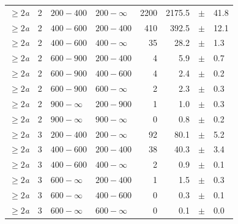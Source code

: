 \begin{table}[!h]
\begin{tabular}{rrllrrcl}
$\geq 2${\it a}\T & 2 & $ 200- 400$ & $200-\infty$ &   2200 &   2175.5 &$\pm$&   41.8 \\
$\geq 2${\it a}\T & 2 & $ 400- 600$ & $200-400$ &    410 &    392.5 &$\pm$&   12.1 \\
$\geq 2${\it a} & 2 & $ 400- 600$ & $400-\infty$ &     35 &     28.2 &$\pm$&    1.3 \\
$\geq 2${\it a}\T & 2 & $ 600- 900$ & $200-400$ &      4 &      5.9 &$\pm$&    0.7 \\
$\geq 2${\it a} & 2 & $ 600- 900$ & $400-600$ &      4 &      2.4 &$\pm$&    0.2 \\
$\geq 2${\it a} & 2 & $ 600- 900$ & $600-\infty$ &      2 &      2.3 &$\pm$&    0.3 \\
$\geq 2${\it a}\T & 2 & $ 900- \infty$ & $200-900$ &      1 &      1.0 &$\pm$&    0.3 \\
$\geq 2${\it a} & 2 & $ 900- \infty$ & $900-\infty$ &      0 &      0.8 &$\pm$&    0.2 \\
$\geq 2${\it a}\T & 3 & $ 200- 400$ & $200-\infty$ &     92 &     80.1 &$\pm$&    5.2 \\
$\geq 2${\it a}\T & 3 & $ 400- 600$ & $200-400$ &     38 &     40.3 &$\pm$&    3.4 \\
$\geq 2${\it a} & 3 & $ 400- 600$ & $400-\infty$ &      2 &      0.9 &$\pm$&    0.1 \\
$\geq 2${\it a}\T & 3 & $ 600- \infty$ & $200-400$ &      1 &      1.5 &$\pm$&    0.3 \\
$\geq 2${\it a} & 3 & $ 600- \infty$ & $400-600$ &      0 &      0.3 &$\pm$&    0.1 \\
$\geq 2${\it a} & 3 & $ 600- \infty$ & $600-\infty$ &      0 &      0.1 &$\pm$&    0.0 \\
    \hline
  \end{tabular}
\end{table}

